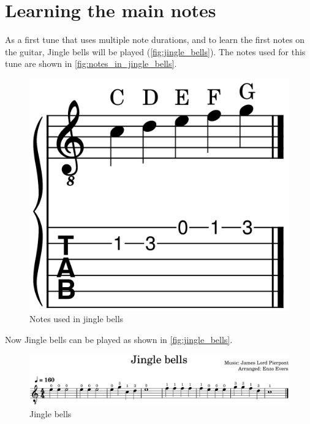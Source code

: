 \newpage

\section{Learning the main notes} \label{sec:learning_main_notes}

As a first tune that uses multiple note durations, and to learn the first notes on the guitar, Jingle bells will be played (\autoref{fig:jingle_bells}). The notes used for this tune are shown in \autoref{fig:notes_in_jingle_bells}.

\begin{figure}[h]
	\centering
	\includegraphics[height=0.12\textheight]{../../MuseScore/Guitar/NotesInJingleBells.png}
	\caption{Notes used in jingle bells}
	\label{fig:notes_in_jingle_bells}
\end{figure}

Now Jingle bells can be played as shown in \autoref{fig:jingle_bells}.

\begin{figure}[h]
	\centering
	\includegraphics[width=\textwidth]{../../MuseScore/Guitar/GuitarJingleBells.png}
	\caption{Jingle bells}
	\label{fig:jingle_bells}
\end{figure}

